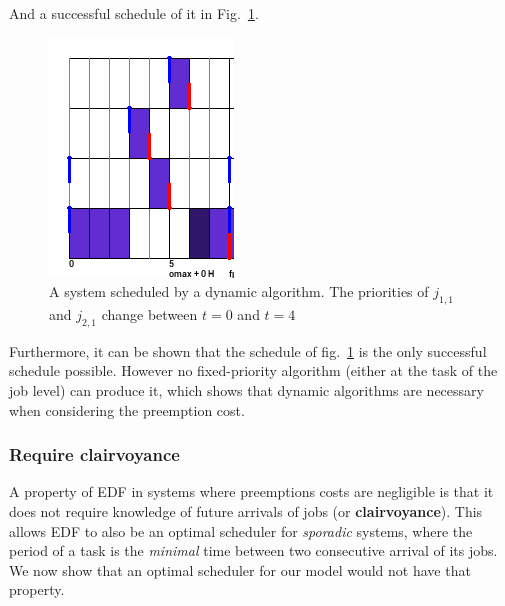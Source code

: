 \documentclass[a4paper,10pt]{article}
\begin{document}
        And a successful schedule of it in Fig.~\ref{fig:dponly_pallf}.

        \begin{figure}[H]
        \begin{center}
            \includegraphics[scale=0.7]{figs/dponly_palff.png}
            \caption{A system scheduled by a dynamic algorithm. The priorities of $j_{1,1}$ and $j_{2,1}$ change between $t=0$ and $t=4$}
            \label{fig:dponly_pallf}
        \end{center}
        \end{figure}

        Furthermore, it can be shown that the schedule of fig.~\ref{fig:dponly_pallf} is the only successful schedule possible. However no fixed-priority algorithm (either at the task of the job level) can produce it, which shows that dynamic algorithms are necessary when considering the preemption cost.


        \subsubsection{Require clairvoyance}

        A property of EDF in systems where preemptions costs are negligible is that it does not require knowledge of future arrivals of jobs (or \textbf{clairvoyance}). This allows EDF to also be an optimal scheduler for \emph{sporadic} systems, where the period of a task is the \emph{minimal} time between two consecutive arrival of its jobs. We now show that an optimal scheduler for our model would not have that property.\\
\end{document}
